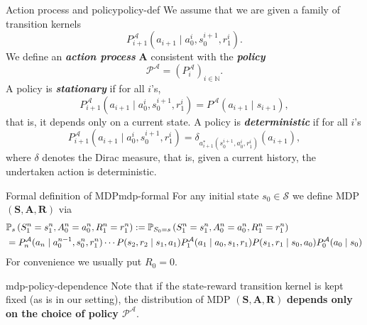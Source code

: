\documentclass[a4paper, 11pt]{article}
\numberwithin{equation}{section}
\theoremstyle{plain}
\theoremstyle{definition}
\newcommand{\1}{{\mathbbm 1}}
\newcommand{\mb}[1]{\mathbf{#1}}
\newcommand{\mc}[1]{\mathcal{#1}}
\newcommand{\bi}[1]{\textbf{\textit{#1}}}
\newcommand{\N}{{\mathbb{N}}}
\begin{document}
	\begin{fdefi}{Action process and policy}{policy-def}
		We assume that we are given a family of transition kernels
		\begin{equation}
			P^{\mc{A}}_{i + 1}(a_{i + 1}\;|\; a_0^{i}, s_{0}^{i + 1}, r_{1}^{i}).
		\end{equation}
		We define an \bi{action process} $\mb{A}$ consistent with the \bi{policy} 
		\begin{equation}
			\mc{P}^\mc{A} =(P^{\mc{A}}_i)_{i \in \N}.
		\end{equation}
		A policy is \bi{stationary} if for all $i$'s, 
		\begin{equation}
			P^{\mc{A}}_{i + 1}(a_{i + 1}\;|\; a_0^{i}, s_{0}^{i + 1}, r_{1}^{i}) =  P^{\mc{A}}(a_{i + 1}\;|\; s_{i +1 }),
		\end{equation}
		that is, it depends only on a current state. A policy is \bi{deterministic} if for all $i$'s
		\begin{equation}
			P^{\mc{A}}_{i + 1}(a_{i + 1}\;|\; a_0^{i}, s_{0}^{i + 1}, r_{1}^{i}) =  \delta_{a^*_{i+1}(s_0^{i+1}, a_0^i, r_1^i)}(a_{i+1}),
		\end{equation}
		where $\delta$ denotes the Dirac measure, that is, given a current history, the undertaken action is deterministic.
	\end{fdefi}
	
	\begin{fdefi}{Formal definition of MDP}{mdp-formal}
		For any initial state $s_0 \in \mc{S}$ we define MDP $(\mb{S}, \mb{A}, \mb{R})$ via
		\begin{equation}\label{mdp}
			\begin{split}
				&\pof[S_{1}^{n} = s_{1}^{n}, A_0^{n} = a_0^{n},  R_{1}^{n} = r_{1}^{n}][s] := \pof[S_{1}^{n} = s_{1}^{n}, A_0^{n} = a_0^{n},  R_{1}^{n} = r_{1}^{n}][S_0 = s]\\
				&  =P^{\mc{A}}_{n}(a_{n}\;|\; a_0^{n - 1}, s_{0}^{n}, r_{1}^{n})\cdots P(s_2, r_2\;|\; s_1, a_1) P_1^{\mc{A}}(a_1\;|\; a_0, s_1, r_1)P(s_1, r_1\;|\; s_0, a_0)P_0^{\mc{A}}(a_0\;|\; s_0) 
			\end{split}
		\end{equation}
		For convenience we usually put $R_0 = 0$. 
	\end{fdefi}
	
	\begin{frema}{}{mdp-policy-dependence}
		Note that if the state-reward transition kernel is kept fixed (as is in our setting), the distribution of MDP $(\mb{S}, \mb{A}, \mb{R})$ \textbf{depends only on the choice of policy $\mc{P}^{\mc{A}}$}.
	\end{frema}
	
\end{document}
